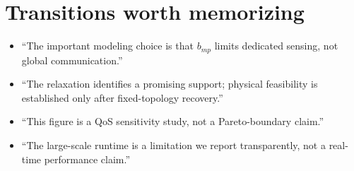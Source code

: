 \section{Transitions worth memorizing}
\begin{itemize}
\item ``The important modeling choice is that $b_{mp}$ limits dedicated sensing, not global communication.''
\item ``The relaxation identifies a promising support; physical feasibility is established only after fixed-topology recovery.''
\item ``This figure is a QoS sensitivity study, not a Pareto-boundary claim.''
\item ``The large-scale runtime is a limitation we report transparently, not a real-time performance claim.''
\end{itemize}
